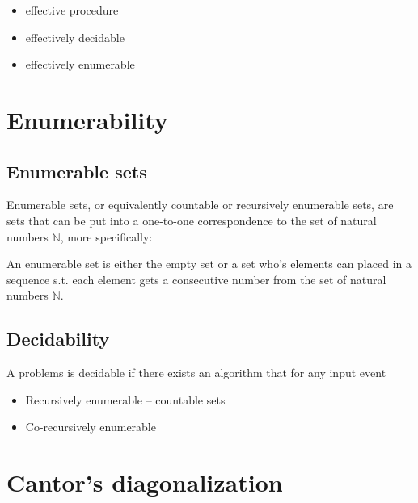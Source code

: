 \begin{itemize}

\item effective procedure

\item effectively decidable

\item effectively enumerable

\end{itemize}


\section{Enumerability}

\subsection{Enumerable sets}

Enumerable sets, or equivalently countable or recursively enumerable sets, are
sets that can be put into a one-to-one correspondence to the set of natural
numbers $\mathbb{N}$, more specifically:

\begin{definition} An enumerable set is either the empty set or a set who's
elements can placed in a sequence s.t. each element gets a consecutive number
from the set of natural numbers $\mathbb{N}$.\end{definition}

\subsection{Decidability}

\begin{definition} A problems is decidable if there exists an algorithm that for any input event
\end{definition}

\begin{itemize}

\item Recursively enumerable -- countable sets

\item Co-recursively enumerable

\end{itemize}


\section{Cantor's diagonalization}

